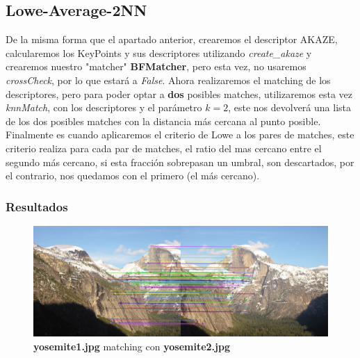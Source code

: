 \documentclass{article}
\begin{document}
\newpage

\subsection{Lowe-Average-2NN}

De la misma forma que el apartado anterior, crearemos el descriptor AKAZE, calcularemos los KeyPoints y sus descriptores utilizando \textit{create\_akaze} y crearemos nuestro "matcher" \textbf{BFMatcher}, pero esta vez, no usaremos \textit{crossCheck}, por lo que estará a \textit{False}. Ahora realizaremos el matching de los descriptores, pero para poder optar a \textbf{dos} posibles matches, utilizaremos esta vez \textit{knnMatch}, con los descriptores y el parámetro $k=2$, este nos devolverá una lista de los dos posibles matches con la distancia más cercana al punto posible. 
\newline
Finalmente es cuando aplicaremos el criterio de Lowe a los pares de matches, este criterio realiza para cada par de matches, el ratio del mas cercano entre el segundo más cercano, si esta fracción sobrepasan un umbral, son descartados, por el contrario, nos quedamos con el primero (el más cercano).

\subsubsection{Resultados}


\begin{figure}[hbt!]
	\centering
	\includegraphics[width=1.0\textwidth]{../assets/Ejercicio2-Lowe_criteria.png}
	\caption{\textbf{yosemite1.jpg} matching con \textbf{yosemite2.jpg}}
\end{figure}
\end{document}
